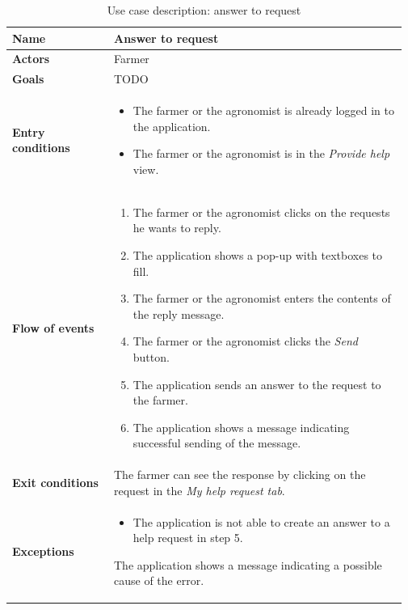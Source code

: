 \begin{table}[H]
    \centering
	\begin{tabular}{@{}p{0.25\linewidth} p{0.72\linewidth}@{}}
\toprule
		\textbf{Name}               & Answer to request\\
		\midrule
		\textbf{Actors}             & Farmer\\
		\midrule
		\textbf{Goals}              & TODO \\
		\midrule
		
		\textbf{Entry conditions}   & \begin{itemize}[leftmargin=.4cm,noitemsep,topsep=0pt,before=\vspace{-3mm},after=\vspace{-4mm}]
		    \item The farmer or the agronomist is already logged in to the application.
		    \item The farmer or the agronomist is in the \textit{Provide help} view.
		\end{itemize}\\
		\midrule
		
		\textbf{Flow of events}     & \begin{enumerate}[leftmargin=.4cm,noitemsep,topsep=0pt,before=\vspace{-3mm},after=\vspace{-4mm}]
		    \item The farmer or the agronomist clicks on the requests he wants to reply. 
		    \item The application shows a pop-up with textboxes to fill.
		    \item The farmer or the agronomist enters the contents of the reply message.
		    \item The farmer or the agronomist clicks the \textit{Send} button.
		    \item The application sends an answer to the request to the farmer.
		    \item The application shows a message indicating successful sending of the message.
		\end{enumerate}\\
		\midrule
		\textbf{Exit conditions}    & The farmer can see the response by clicking on the request in the \textit{My help request tab}. \\
		\midrule
		
		\textbf{Exceptions}         & 
	    \begin{itemize}[leftmargin=.4cm,noitemsep,topsep=0pt,before=\vspace{-3mm}]
		   \item The application is not able to create an answer to a help request in step 5. 
		\end{itemize}
		The application shows a message indicating a possible cause of the error.
		\\\bottomrule
	\end{tabular}
	\caption{Use case description: answer to request} 
\end{table}

